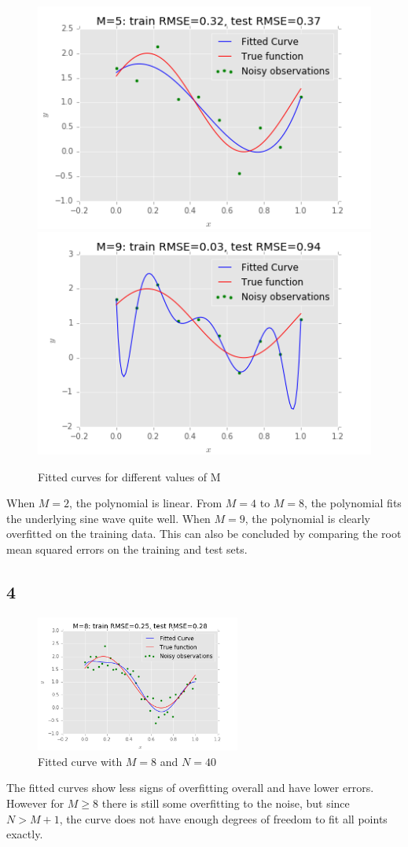 \documentclass{article}
\begin{document}
\begin{figure}[H]
\includegraphics[width=.49\textwidth]{images/fit_m5_n_10.png}
\includegraphics[width=.49\textwidth]{images/fit_m9_n_10.png}
\caption{Fitted curves for different values of M}
\end{figure}
When $M=2$, the polynomial is linear. From $M=4$ to $M=8$, the polynomial fits the underlying sine wave quite well. When $M=9$, the polynomial is clearly overfitted on the training data. This can also be concluded by comparing the root mean squared errors on the training and test sets.
\subsection*{4}
\begin{figure}[H]
\centering
\includegraphics[width=0.6\textwidth]{images/fit_m8_n_40.png}
\caption{Fitted curve with $M=8$ and $N=40$}
\end{figure}
The fitted curves show less signs of overfitting overall and have lower errors. However for $M \geq 8$ there is still some overfitting to the noise, but since $N > M + 1$, the curve does not have enough degrees of freedom to fit all points exactly.
\end{document}
